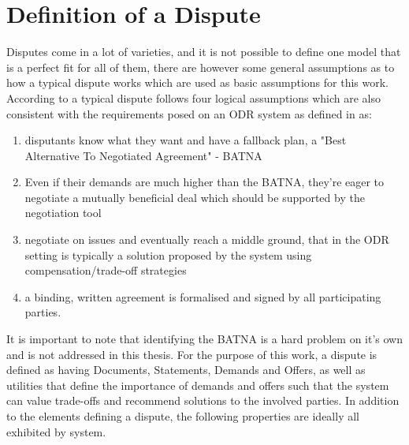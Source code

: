 \documentclass[12pt,msc,a4paper,oneside]{ucl_thesis}
\begin{document}
\section{Definition of a Dispute} \label{sec:definition_of_dispute}
Disputes come in a lot of varieties, and it is not possible to define one model that is a perfect fit for all of them, there are however some general assumptions as to how a typical dispute works which are used as basic assumptions for this work. According to \cite{Susskind:Logic_of_mediating_values} a typical dispute follows four logical assumptions which are also consistent with the requirements posed on an ODR system as defined in \cite{Lodder:ORD_system_design} as:
\begin{enumerate}
    \item{disputants know what they want and have a fallback plan, a "Best Alternative To Negotiated Agreement" - BATNA}
    \item{Even if their demands are much higher than the BATNA, they're eager to negotiate a mutually beneficial deal which should be supported by the negotiation tool}
    \item{negotiate on issues and eventually reach a middle ground, that in the ODR setting is typically a solution proposed by the system using compensation/trade-off strategies}
    \item{a binding, written agreement is formalised and signed by all participating parties.}
\end{enumerate}
It is important to note that identifying the BATNA is a hard problem on it's own and is not addressed in this thesis. For the purpose of this work, a dispute is defined as having Documents, Statements, Demands and Offers, as well as utilities that define the importance of demands and offers such that the system can value trade-offs and recommend solutions to the involved parties. In addition to the elements defining a dispute, the following properties are ideally all exhibited by system.
\end{document}
